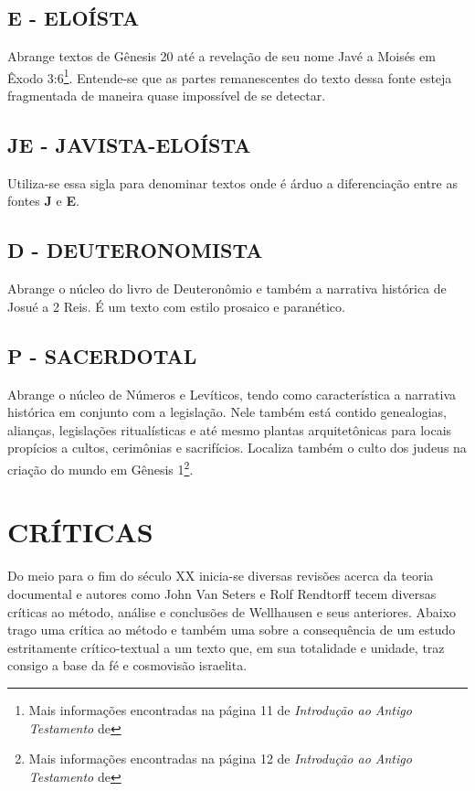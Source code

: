 \documentclass[
    article,            %
	12pt,				%
	oneside,			%
	a4paper,			%
	english,			%
	french,				%
	spanish,			%
	brazil				%
	]{abntex2}
\begin{document}
\subsection{E - ELOÍSTA}
Abrange textos de Gênesis 20 até a revelação de seu nome Javé a Moisés em Êxodo 3:6\footnote{Mais informações encontradas na página 11 de \emph{Introdução ao Antigo Testamento} de }. Entende-se que as partes remanescentes do texto dessa fonte esteja fragmentada de maneira quase impossível de se detectar.

\subsection{JE - JAVISTA-ELOÍSTA}
Utiliza-se essa sigla para denominar textos onde é árduo a diferenciação entre as fontes \textbf{J} e \textbf{E}.

\subsection{D - DEUTERONOMISTA}
Abrange o núcleo do livro de Deuteronômio e também a narrativa histórica de Josué a 2 Reis. É um texto com estilo prosaico e paranético.

\subsection{P - SACERDOTAL}
Abrange o núcleo de Números e Levíticos, tendo como característica a narrativa histórica em conjunto com a legislação. Nele também está contido genealogias, alianças, legislações ritualísticas e até mesmo plantas arquitetônicas para locais propícios a cultos, cerimônias e sacrifícios. Localiza também o culto dos judeus na criação do mundo em Gênesis 1\footnote{Mais informações encontradas na página 12 de \emph{Introdução ao Antigo Testamento} de }.

\section{CRÍTICAS}
Do meio para o fim do século XX inicia-se diversas revisões acerca da teoria documental e autores como John Van Seters e Rolf Rendtorff tecem diversas críticas ao método, análise e conclusões de Wellhausen e seus anteriores. Abaixo trago uma crítica ao método e também uma sobre a consequência de um estudo estritamente crítico-textual a um texto que, em sua totalidade e unidade, traz consigo a base da fé e cosmovisão israelita.
\end{document}
